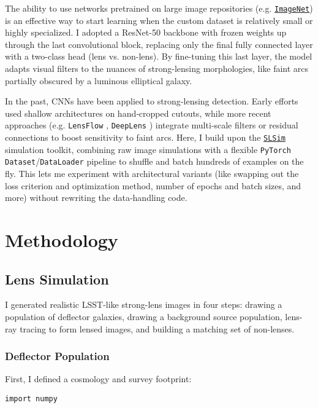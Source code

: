 \documentclass[trackchanges,twocolumn]{aastex7}
\begin{document}
The ability to use networks pretrained on large image repositories (e.g. \href{https://www.image-net.org/}{\tt\string ImageNet}) is an effective way to start learning when the custom dataset is relatively small or highly specialized. I adopted a ResNet-50 backbone with frozen weights up through the last convolutional block, replacing only the final fully connected layer with a two-class head (lens vs. non-lens). By fine-tuning this last layer, the model adapts visual filters to the nuances of strong-lensing morphologies, like faint arcs partially obscured by a luminous elliptical galaxy.

In the past, CNNs have been applied to strong‐lensing detection. Early efforts used shallow architectures on hand‐cropped cutouts, while more recent approaches (e.g. {\tt\string LensFlow} \citep{pourrahmani2018}, {\tt\string DeepLens} \citep{lanusse2018}) integrate multi‐scale filters or residual connections to boost sensitivity to faint arcs. Here, I build upon the \href{https://github.com/LSST-strong-lensing/slsim/tree/main}{\tt\string SLSim} simulation toolkit, combining raw image simulations with a flexible {\tt\string PyTorch Dataset}/{\tt\string DataLoader} pipeline to shuffle and batch hundreds of examples on the fly. This lets me experiment with architectural variants (like swapping out the loss criterion and optimization method, number of epochs and batch sizes, and more) without rewriting the data‐handling code.


\section{Methodology} \label{sec:methodology}


\subsection{Lens Simulation}

I generated realistic LSST-like strong-lens images in four steps: drawing a population of deflector galaxies, drawing a background source population, lens-ray tracing to form lensed images, and building a matching set of non-lenses.


\subsubsection{Deflector Population}

First, I defined a cosmology and survey footprint:

\begin{lstlisting}
import numpy 
\end{lstlisting}
\end{document}
